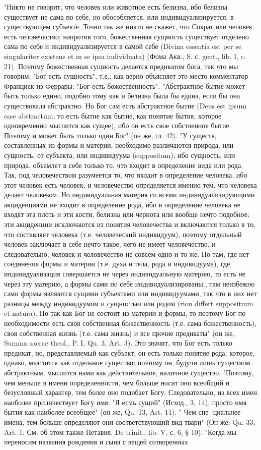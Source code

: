\documentclass[12pt,oneside]{book}
\begin{document}
"Никто не говорит, что человек или животное есть белизна, ибо белизна существует не сама по себе, но обособляется, или индивидуализируется, в существующем субъекте. Точно так же никто не скажет, что Сократ или человек есть человечество; напротив того, божественная сущность существует отделено сама по себе и индивидуализируется в самой себе (Divina essentia est per se singulariter existens et in se ipsa individuata) (Фома Акв., S. с. gent., lib. I, c. 21). Поэтому божественная сущность делается предикатом бога, так что мы говорим: "Бог есть сущность", т.е., как верно объясняет это место комментатор Франциск из Феррары: "Бог есть божественность". "Абстрактное бытие может быть только едино, подобно тому как и белизна была бы едина, если бы она существовала абстрактно. Но Бог сам есть абстрактное бытие (Deus est ipsum esse abstractum, то есть бытие как бытие, как понятие бытия, которое одновременно мыслится как сущее), ибо он есть свое собственное бытие. Поэтому и может быть только один Бог" (он же, гл. 42). "У существ, составленных из формы и материи, необходимо различаются природа, или сущность, от субъекта, или индивидуума (suppositum), ибо сущность, или природа, объемлет в себе только то, что входит в определение вида или рода. Так, под человечеством разумеется то, что входит в определение человека, ибо этот человек есть человек, и человечество определяется именно тем, что человека делает человеком. Но индивидуальная материя со всеми индивидуализирующими акциденциями не входит в определение рода, ибо в определение человека не входят эта плоть и эти кости, белизна или чернота или вообще нечто подобное; эти акциденции исключаются из понятия человечества и включаются только в то, что составляет человека (т.е. человеческий индивидуум), поэтому отдельный человек заключает в себе нечто такое, чего не имеет человечество, и следовательно, человек и человечество не совсем одно и то же. Но там, где нет соединения формы и материи (т.е. духа и тела, рода и индивидуума), где индивидуализация совершается не через индивидуальную материю, то есть не через эту материю, а формы сами по себе индивидуализированы:, там неизбежно сами формы являются сущими субъектами или индивидуумами, так что в них нет разницы между индивидуумом и сущностью или родом (rion differt suppositium et natura). Но так как Бог не состоит из материи и формы, то поэтому Бог по необходимости есть своя собственная божественность (т.е. сама божественность), своя собственная жизнь (т.е. сама жизнь) и все прочие предикаты" (он же, Summa sacrae theol., P. I, Qu. 3, Art. 3). Это значит, что Бог есть только предикат, но, представляемый как субъект, он есть только понятие рода, которое, однако, мыслится как отдельное существо; поэтому он, будучи лишь существом абстрактным, мыслится нами как действительное, наличное существо. "Поэтому, чем меньше в имени определенности, чем больше носит оно всеобщий и безусловный характер, тем более оно подобает Богу. Следовательно, из всех имен наиболее приличествует Богу имя: "Я есмь сущий" (Исход., 3, 14), просто имя бытия как наиболее всеобщее" (он же, Qu. 13, Art. 11). " Чем спе- циальнее имена, тем больше определяют они соответствующий вид твари" (Он же, Qu. 33, Art. 1. См. об этом также Петавия. De trinit., lib. V, с. 6, § 10). "Когда мы переносим названия рождения и сына с вещей сотворенных 
\end{document}
